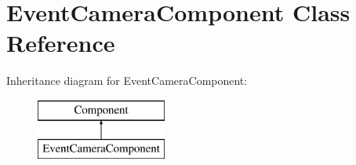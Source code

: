 \hypertarget{class_event_camera_component}{\section{Event\+Camera\+Component Class Reference}
\label{class_event_camera_component}
}
Inheritance diagram for Event\+Camera\+Component\+:\begin{figure}[H]
\begin{center}
\leavevmode
\includegraphics[height=2.000000cm]{class_event_camera_component}
\end{center}
\end{figure}
